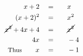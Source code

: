 \begin{alignat*}{5}
&\,&x+2\quad&=\quad&&x\\
&\,&(x+2)^2\quad&=&& x^2\\
&\,&\cancel{x^2}+4x+4\quad&=&&\cancel{x^2}\\
&\,&4x\quad&=&&-4\\
&\,&\small\text{Thus}\normalsize\qquad x\quad&=&&-1
\end{alignat*}

